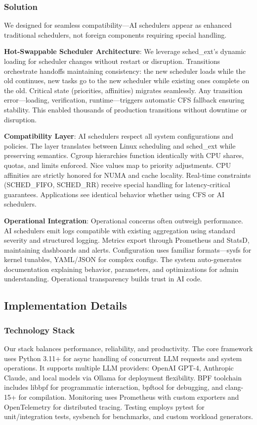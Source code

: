 \subsubsection{Solution}
We designed for seamless compatibility—AI schedulers appear as enhanced traditional schedulers, not foreign components requiring special handling.

\textbf{Hot-Swappable Scheduler Architecture}: We leverage sched\_ext's dynamic loading for scheduler changes without restart or disruption. Transitions orchestrate handoffs maintaining consistency: the new scheduler loads while the old continues, new tasks go to the new scheduler while existing ones complete on the old. Critical state (priorities, affinities) migrates seamlessly. Any transition error—loading, verification, runtime—triggers automatic CFS fallback ensuring stability. This enabled thousands of production transitions without downtime or disruption.

\textbf{Compatibility Layer}: AI schedulers respect all system configurations and policies. The layer translates between Linux scheduling and sched\_ext while preserving semantics. Cgroup hierarchies function identically with CPU shares, quotas, and limits enforced. Nice values map to priority adjustments. CPU affinities are strictly honored for NUMA and cache locality. Real-time constraints (SCHED\_FIFO, SCHED\_RR) receive special handling for latency-critical guarantees. Applications see identical behavior whether using CFS or AI schedulers.

\textbf{Operational Integration}: Operational concerns often outweigh performance. AI schedulers emit logs compatible with existing aggregation using standard severity and structured logging. Metrics export through Prometheus and StatsD, maintaining dashboards and alerts. Configuration uses familiar formats—sysfs for kernel tunables, YAML/JSON for complex configs. The system auto-generates documentation explaining behavior, parameters, and optimizations for admin understanding. Operational transparency builds trust in AI code.

\subsection{Implementation Details}

\subsubsection{Technology Stack}
Our stack balances performance, reliability, and productivity. The core framework uses Python 3.11+ for async handling of concurrent LLM requests and system operations. It supports multiple LLM providers: OpenAI GPT-4, Anthropic Claude, and local models via Ollama for deployment flexibility. BPF toolchain includes libbpf for programmatic interaction, bpftool for debugging, and clang-15+ for compilation. Monitoring uses Prometheus with custom exporters and OpenTelemetry for distributed tracing. Testing employs pytest for unit/integration tests, sysbench for benchmarks, and custom workload generators.

